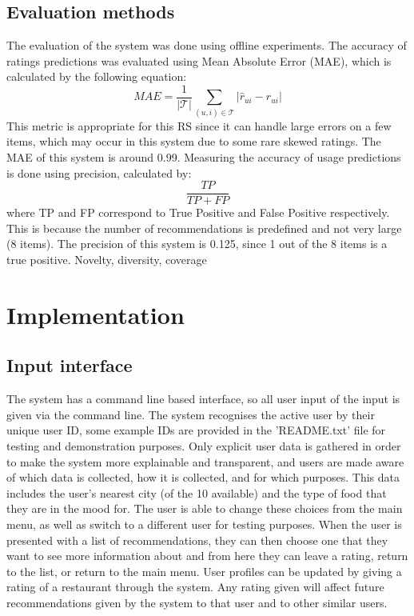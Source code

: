 \documentclass[conference]{IEEEtran}
\begin{document}
\subsection{Evaluation methods}
The evaluation of the system was done using offline experiments. 
The accuracy of ratings predictions was evaluated using Mean Absolute Error (MAE), which is calculated by the 
following equation:
\begin{equation}
    MAE = \frac{1}{|\mathcal{T}|} \sum_{(u,i)\in{\mathcal{T}}} {|\widehat{r}_{ui} - r_{ui}|}
\end{equation}
This metric is appropriate for this RS since it can handle large errors on a few items, which may occur in this system 
due to some rare skewed ratings. 
The MAE of this system is around 0.99. 
Measuring the accuracy of usage predictions is done using precision, calculated by: 
\begin{equation}
    \frac{TP}{TP+FP}
\end{equation}
where TP and FP correspond to True Positive and False Positive respectively. 
This is because the number of recommendations is predefined and not very large (8 items). 
The precision of this system is 0.125, since 1 out of the 8 items is a true positive. 
Novelty, diversity, coverage

\section{Implementation}

\subsection{Input interface}
The system has a command line based interface, so all user input of the input is given via the command line. 
The system recognises the active user by their unique user ID, some example IDs are provided in the 'README.txt' 
file for testing and demonstration purposes. 
Only explicit user data is gathered in order to make the system more explainable and transparent, 
and users are made aware of which data is collected, how it is collected, and for which purposes. 
This data includes the user's nearest city (of the 10 available) and the type of food that 
they are in the mood for. 
The user is able to change these choices from the main menu, as well as switch to a different user 
for testing purposes. 
When the user is presented with a list of recommendations, they can then choose one that they want 
to see more information about and from here they can leave a rating, return to the list, or return to 
the main menu. 
User profiles can be updated by giving a rating of a restaurant through the system. 
Any rating given will affect future recommendations given by the system to that user 
and to other similar users. 
\end{document}
